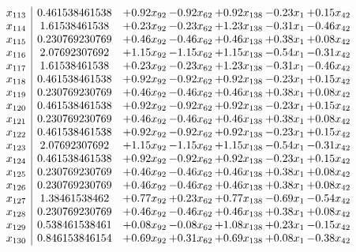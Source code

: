 \documentclass[8pt]{article}
\begin{document}
\[\begin{array}{c| c c@{\hskip 2pt} c@{\hskip 2pt} c@{\hskip 2pt} c@{\hskip 2pt} c@{\hskip 2pt} }
 x_{113}   &  0.461538461538 & +  0.92 x_{92} & -0.92 x_{62} & +  0.92 x_{138} & -0.23 x_{1} & +  0.15 x_{42}\\
 x_{114}   &  1.61538461538 & +  0.23 x_{92} & -0.23 x_{62} & +  1.23 x_{138} & -0.31 x_{1} & -0.46 x_{42}\\
 x_{115}   &  0.230769230769 & +  0.46 x_{92} & -0.46 x_{62} & +  0.46 x_{138} & +  0.38 x_{1} & +  0.08 x_{42}\\
 x_{116}   &  2.07692307692 & +  1.15 x_{92} & -1.15 x_{62} & +  1.15 x_{138} & -0.54 x_{1} & -0.31 x_{42}\\
 x_{117}   &  1.61538461538 & +  0.23 x_{92} & -0.23 x_{62} & +  1.23 x_{138} & -0.31 x_{1} & -0.46 x_{42}\\
 x_{118}   &  0.461538461538 & +  0.92 x_{92} & -0.92 x_{62} & +  0.92 x_{138} & -0.23 x_{1} & +  0.15 x_{42}\\
 x_{119}   &  0.230769230769 & +  0.46 x_{92} & -0.46 x_{62} & +  0.46 x_{138} & +  0.38 x_{1} & +  0.08 x_{42}\\
 x_{120}   &  0.461538461538 & +  0.92 x_{92} & -0.92 x_{62} & +  0.92 x_{138} & -0.23 x_{1} & +  0.15 x_{42}\\
 x_{121}   &  0.230769230769 & +  0.46 x_{92} & -0.46 x_{62} & +  0.46 x_{138} & +  0.38 x_{1} & +  0.08 x_{42}\\
 x_{122}   &  0.461538461538 & +  0.92 x_{92} & -0.92 x_{62} & +  0.92 x_{138} & -0.23 x_{1} & +  0.15 x_{42}\\
 x_{123}   &  2.07692307692 & +  1.15 x_{92} & -1.15 x_{62} & +  1.15 x_{138} & -0.54 x_{1} & -0.31 x_{42}\\
 x_{124}   &  0.461538461538 & +  0.92 x_{92} & -0.92 x_{62} & +  0.92 x_{138} & -0.23 x_{1} & +  0.15 x_{42}\\
 x_{125}   &  0.230769230769 & +  0.46 x_{92} & -0.46 x_{62} & +  0.46 x_{138} & +  0.38 x_{1} & +  0.08 x_{42}\\
 x_{126}   &  0.230769230769 & +  0.46 x_{92} & -0.46 x_{62} & +  0.46 x_{138} & +  0.38 x_{1} & +  0.08 x_{42}\\
 x_{127}   &  1.38461538462 & +  0.77 x_{92} & +  0.23 x_{62} & +  0.77 x_{138} & -0.69 x_{1} & -0.54 x_{42}\\
 x_{128}   &  0.230769230769 & +  0.46 x_{92} & -0.46 x_{62} & +  0.46 x_{138} & +  0.38 x_{1} & +  0.08 x_{42}\\
 x_{129}   &  0.538461538461 & +  0.08 x_{92} & -0.08 x_{62} & +  1.08 x_{138} & +  0.23 x_{1} & -0.15 x_{42}\\
 x_{130}   &  0.846153846154 & +  0.69 x_{92} & +  0.31 x_{62} & +  0.69 x_{138} & +  0.08 x_{1} & -0.38 x_{42}\\

\end{array}\]
\end{document}
